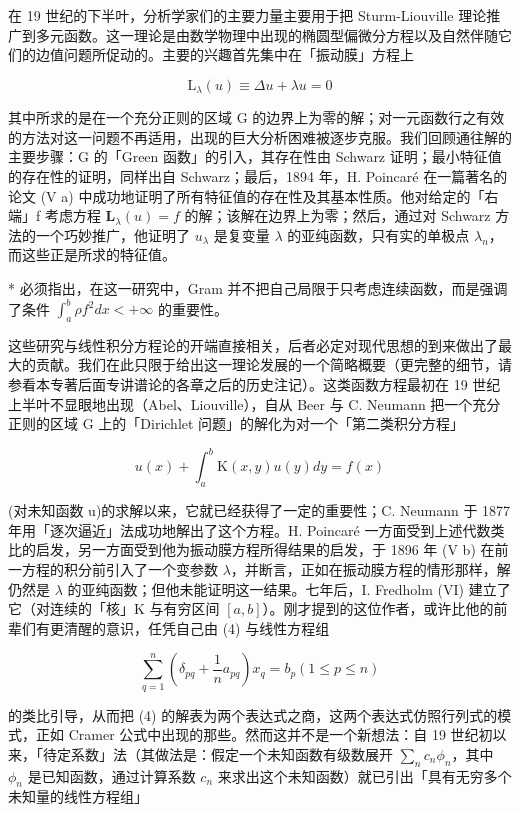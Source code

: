 在 19 世纪的下半叶，分析学家们的主要力量主要用于把 Sturm-Liouville 理论推广到多元函数。这一理论是由数学物理中出现的椭圆型偏微分方程以及自然伴随它们的边值问题所促动的。主要的兴趣首先集中在「振动膜」方程上

\[
\mathrm{L} _ {\lambda} (u) \equiv \Delta u + \lambda u = 0\tag{3}
\]

其中所求的是在一个充分正则的区域 G 的边界上为零的解；对一元函数行之有效的方法对这一问题不再适用，出现的巨大分析困难被逐步克服。我们回顾通往解的主要步骤：G 的「Green 函数」的引入，其存在性由 Schwarz 证明；最小特征值的存在性的证明，同样出自 Schwarz；最后，1894 年，H. Poincaré 在一篇著名的论文 (V a) 中成功地证明了所有特征值的存在性及其基本性质。他对给定的「右端」f 考虑方程 \(\mathbf{L}_{\lambda}(u) = f\) 的解；该解在边界上为零；然后，通过对 Schwarz 方法的一个巧妙推广，他证明了 \(u_{\lambda}\) 是复变量 \(\lambda\) 的亚纯函数，只有实的单极点 \(\lambda_{n}\)，而这些正是所求的特征值。

* 必须指出，在这一研究中，Gram 并不把自己局限于只考虑连续函数，而是强调了条件 \(\int_{a}^{b} \rho f^2 dx < +\infty\) 的重要性。

这些研究与线性积分方程论的开端直接相关，后者必定对现代思想的到来做出了最大的贡献。我们在此只限于给出这一理论发展的一个简略概要（更完整的细节，请参看本专著后面专讲谱论的各章之后的历史注记）。这类函数方程最初在 19 世纪上半叶不显眼地出现（Abel、Liouville），自从 Beer 与 C. Neumann 把一个充分正则的区域 G 上的「Dirichlet 问题」的解化为对一个「第二类积分方程」

\[
u (x) + \int_ {a} ^ {b} \mathrm{K} (x, y) u (y) d y = f (x)\tag{4}
\]

(对未知函数 u)的求解以来，它就已经获得了一定的重要性；C. Neumann 于 1877 年用「逐次逼近」法成功地解出了这个方程。H. Poincaré 一方面受到上述代数类比的启发，另一方面受到他为振动膜方程所得结果的启发，于 1896 年 (V b) 在前一方程的积分前引入了一个变参数 \(\lambda\)，并断言，正如在振动膜方程的情形那样，解仍然是 \(\lambda\) 的亚纯函数；但他未能证明这一结果。七年后，I. Fredholm (VI) 建立了它（对连续的「核」K 与有穷区间 \([a, b]\)）。刚才提到的这位作者，或许比他的前辈们有更清醒的意识，任凭自己由 (4) 与线性方程组

\[
\sum_ {q = 1} ^ {n} \left(\delta_ {p q} + \frac {1}{n} a _ {p q}\right) x _ {q} = b _ {p} (1 \leqslant p \leqslant n)\tag{5}
\]

的类比引导，从而把 (4) 的解表为两个表达式之商，这两个表达式仿照行列式的模式，正如 Cramer 公式中出现的那些。然而这并不是一个新想法：自 19 世纪初以来，「待定系数」法（其做法是：假定一个未知函数有级数展开 \(\sum_{n} c_{n} \phi_{n}\)，其中 \(\phi_{n}\) 是已知函数，通过计算系数 \(c_{n}\) 来求出这个未知函数）就已引出「具有无穷多个未知量的线性方程组」

